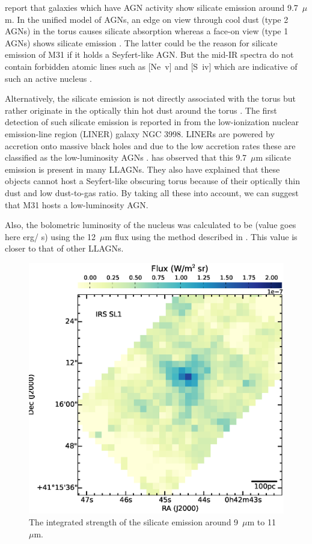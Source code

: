 \citet{Spoon2007} report that galaxies which have AGN activity show silicate emission around 9.7~$\mu$m.
In the unified model of AGNs, an edge on view through cool dust (type 2 AGNs) in the torus causes silicate absorption whereas a face-on view (type 1 AGNs) 
shows silicate emission \citep{AGNtypes1995}. The latter could be the reason for silicate emission of M31 if it holds a Seyfert-like AGN. 
But the mid-IR spectra do not contain forbidden atomic lines such as [Ne~{\sc v}] and [S~{\sc iv}] which are indicative of such an active nucleus \citep{AGNref}.

 Alternatively, the silicate emission is not directly associated with the torus but rather originate in the optically thin hot dust around the torus \citep{Mason2012}. 
 The first detection of such silicate emission is reported in \citet{Sturm2005} from the low-ionization nuclear emission-line region (LINER) galaxy NGC 3998. 
 LINERs are powered by accretion onto massive black holes and due to the low accretion rates these are classified as the low-luminosity AGNs \citep{Kewley2006}. 
 \citealt{Mason2012} has observed that this 9.7~$\mu$m silicate emission is present in many LLAGNs. They also have explained that these objects cannot 
 host a Seyfert-like obscuring torus because of their optically thin dust and low dust-to-gas ratio. By taking all these into account, we can suggest that M31 
 hosts a low-luminosity AGN. 
 
Also, the bolometric luminosity of the nucleus was calculated to be (value goes here erg/ s) using the 12~$\mu$m flux using the method described in \citet{luminosity}. This value is closer to that of other LLAGNs.


\begin{figure}
\centering
\includegraphics[scale = 0.3]{./NUCsilicate.eps}
\caption{ The integrated strength of the silicate emission around 9~$\mu$m to 11~$\mu$m.}
\label{silicate}
\end{figure}
